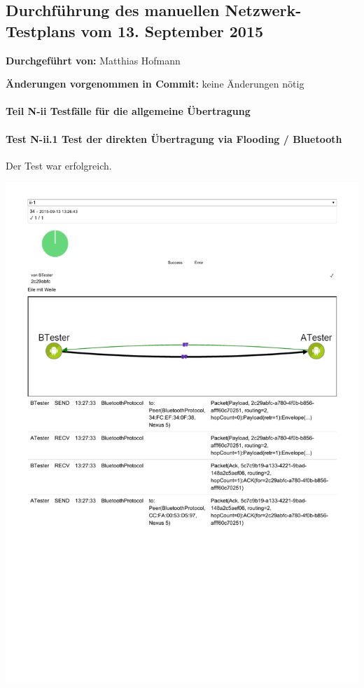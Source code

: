 \subsection{Durchführung des manuellen Netzwerk-Testplans vom 13. September 2015}

\textbf{Durchgeführt von:} Matthias Hofmann

\textbf{Änderungen vorgenommen in Commit:} keine Änderungen nötig

\paragraph{Teil N-ii Testfälle für die allgemeine Übertragung}

\paragraph{Test N-ii.1 Test der direkten Übertragung via Flooding / Bluetooth}

Der Test war erfolgreich.

\includegraphics[trim=0 200 0 0,clip,scale=0.8]{belege/manuelle-tests/netzwerk/Dashboardauszuege/Netzwerktest_n-ii-1.pdf}

